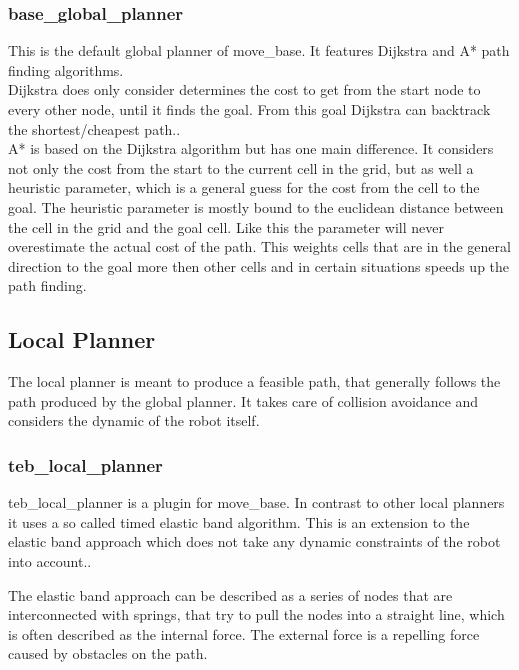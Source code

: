 \subsubsection{base\_global\_planner}
This is the default global planner of move\_base. It features Dijkstra and A* path finding algorithms.\\

Dijkstra does only consider determines the cost to get from the start node to every other node, until it finds the goal. From this goal Dijkstra can backtrack the shortest/cheapest path.\cite{AlgorithmenundDatenstrukturen}.\\

A* is based on the Dijkstra algorithm but has one main difference. It considers not only the cost from the start to the current cell in the grid, but as well a heuristic parameter, which is a general guess for the cost from the cell to the goal. The heuristic parameter is mostly bound to the euclidean distance between the cell in the grid and the goal cell. Like this the parameter will never overestimate the actual cost of the path\cite{AlgorithmenundDatenstrukturen}. This weights cells that are in the general direction to the goal more then other cells and in certain situations speeds up the path finding.\\

\subsection{Local Planner}
The local planner is meant to produce a feasible path, that generally follows the path produced by the global planner. It takes care of collision avoidance and considers the dynamic of the robot itself.

\subsubsection{teb\_local\_planner}
teb\_local\_planner is a plugin for move\_base. In contrast to other local planners it uses a so called timed elastic band algorithm. This is an extension to the elastic band approach which does not take any dynamic constraints of the robot into account.\cite{Rsmann2012TrajectoryMC}.

The elastic band approach can be described as a series of nodes that are interconnected with springs, that try to pull the nodes into a straight line, which is often described as the internal force. The external force is a repelling force caused by obstacles on the path\cite{elasticband}.


